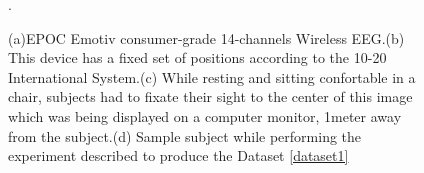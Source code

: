    
\begin{figure}[h!]
\centering
{}
\caption[EPOC Emotiv Alpha Waves Dataset]{(a)EPOC Emotiv consumer-grade 14-channels Wireless EEG.(b) This device has a fixed set of positions according to the 10-20 International System.(c) While resting and sitting confortable in a chair, subjects had to fixate their sight to the center of this image which was being displayed on a computer monitor, 1\si{meter} away from the subject.(d) Sample subject while performing the experiment described to produce the Dataset \ref{dataset1}}.
\label{fig:alpharesults}
\end{figure}

